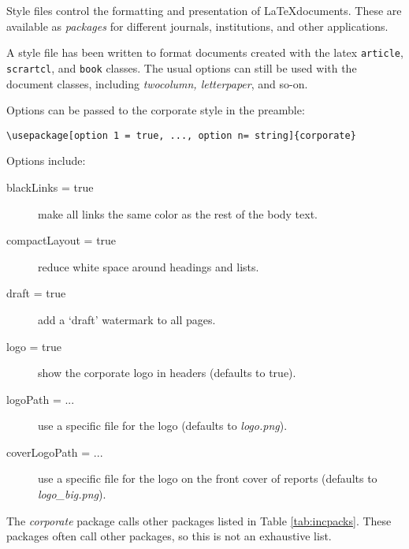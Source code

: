 Style files control the formatting and presentation of \LaTeX documents. These are available as \emph{packages} for different journals, institutions, and other applications. 

A style file has been written to format documents created with the latex \texttt{article}, \texttt{scrartcl}, and \texttt{book} classes. The usual options can still be used with the document classes, including \emph{twocolumn, letterpaper}, and so-on.

Options can be passed to the corporate style in the preamble:

\begin{lstlisting}
\usepackage[option 1 = true, ..., option n= string]{corporate}
\end{lstlisting}

Options include:
\begin{description}
\item[blackLinks = true]{make all links the same color as the rest of the body text.}
\item[compactLayout = true]{reduce white space around headings and lists.}
\item[draft = true]{add a `draft' watermark to all pages.}
\item[logo = true]{show the corporate logo in headers (defaults to true).}
\item[logoPath = ...]{use a specific file for the logo (defaults to \emph{logo.png}).}
\item[coverLogoPath = ...]{use a specific file for the logo on the front cover of reports (defaults to \emph{logo\_big.png}).}
\end{description}

The \emph{corporate} package calls other packages listed in Table \ref{tab:incpacks}. These packages often call other packages, so this is not an exhaustive list.

